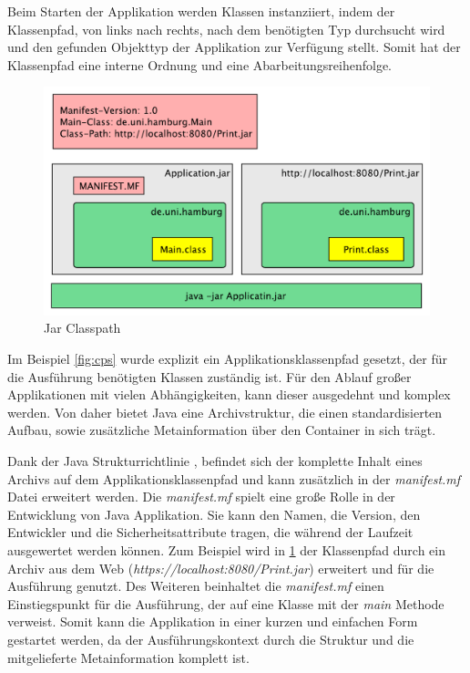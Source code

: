   Beim Starten der Applikation werden Klassen instanziiert, indem der Klassenpfad, von links nach rechts, nach dem benötigten Typ durchsucht wird und den gefunden Objekttyp der Applikation zur Verfügung stellt. Somit hat der Klassenpfad eine interne Ordnung und eine Abarbeitungsreihenfolge. 

  \begin{figure}[h]
    \includegraphics[width=\textwidth]{material/images/Classpath-Manifest2.pdf}
    \caption{Jar Classpath}
    \label{fig:cpa}
  \end{figure}

  Im Beispiel \ref{fig:cps} wurde explizit ein Applikationsklassenpfad gesetzt, der für die Ausführung benötigten Klassen zuständig ist. Für den Ablauf großer Applikationen mit vielen Abhängigkeiten, kann dieser ausgedehnt und komplex werden. Von daher bietet Java eine Archivstruktur, die einen standardisierten Aufbau, sowie zusätzliche Metainformation über den Container in sich trägt. 
  
  Dank der Java Strukturrichtlinie \cite{classLoadingOracle}, befindet sich der komplette Inhalt eines Archivs auf dem Applikationsklassenpfad und kann zusätzlich in der \textit{manifest.mf} Datei erweitert werden. Die \textit{manifest.mf} spielt eine große Rolle in der Entwicklung von Java Applikation. Sie kann den Namen, die Version, den Entwickler und die Sicherheitsattribute tragen, die während der Laufzeit ausgewertet werden können. Zum Beispiel wird in \ref{fig:cpa} der Klassenpfad durch ein Archiv aus dem Web (\textit{https://localhost:8080/Print.jar}) erweitert und für die Ausführung genutzt. Des Weiteren beinhaltet die \textit{manifest.mf} einen Einstiegspunkt für die Ausführung, der auf eine Klasse mit der \textit{main} Methode verweist.\newline
  Somit kann die Applikation in einer kurzen und einfachen Form gestartet werden, da der Ausführungskontext durch die Struktur und die mitgelieferte Metainformation komplett ist. \cite{classLoadingOracle}



